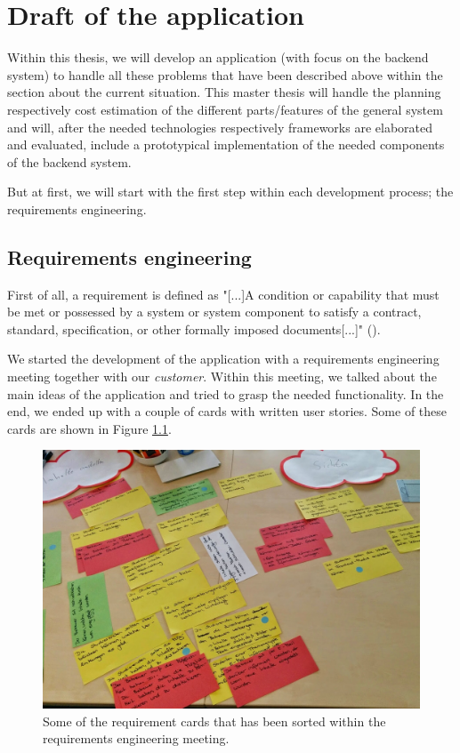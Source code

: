 \chapter[Draft of the application]{Draft of the application}
\label{draft}
Within this thesis, we will develop an application (with focus on the backend system) to handle all these problems that have been described above within the section about the current situation. This master thesis will handle the planning respectively cost estimation of the different parts/features of the general system and will, after the needed technologies respectively frameworks are elaborated and evaluated, include a prototypical implementation of the needed components of the backend system. 

But at first, we will start with the first step within each development process; the requirements engineering.

\section{Requirements engineering}
First of all, a requirement is defined as "[...]A condition or capability that must be met or possessed by a system or system component to satisfy a contract, standard, specification, or other formally imposed documents[...]" (\cite{IEEEReq}).

We started the development of the application with a requirements engineering meeting together with our \textit{customer}. Within this meeting, we talked about the main ideas of the application and tried to grasp the needed functionality. In the end, we ended up with a couple of cards with written user stories. Some of these cards are shown in Figure \ref{cards}.

\begin{figure}[th]
\centerline{\includegraphics[width=1\textwidth]{gfx/cards.jpg}}
\caption{Some of the requirement cards that has been sorted within the requirements engineering meeting.}
\label{cards}
\end{figure} 

